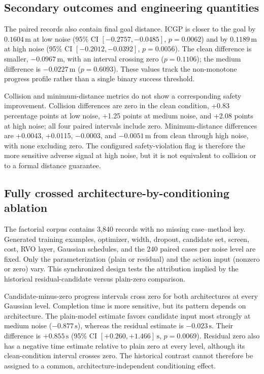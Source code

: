 \documentclass[pdflatex,sn-mathphys-num]{sn-jnl}
\begin{document}
\subsection{Secondary outcomes and engineering quantities}

The paired records also contain final goal distance. ICGP is closer to the goal by $0.1604\,\mathrm{m}$ at low noise (95\% CI $[-0.2757,-0.0485]$, $p=0.0062$) and by $0.1189\,\mathrm{m}$ at high noise (95\% CI $[-0.2012,-0.0392]$, $p=0.0056$). The clean difference is smaller, $-0.0967\,\mathrm{m}$, with an interval crossing zero ($p=0.1106$); the medium difference is $-0.0227\,\mathrm{m}$ ($p=0.6093$). These values track the non-monotone progress profile rather than a single binary success threshold.

Collision and minimum-distance metrics do not show a corresponding safety improvement. Collision differences are zero in the clean condition, +0.83 percentage points at low noise, +1.25 points at medium noise, and +2.08 points at high noise; all four paired intervals include zero. Minimum-distance differences are +0.0043, +0.0115, $-0.0003$, and $-0.0051\,\mathrm{m}$ from clean through high noise, with none excluding zero. The configured safety-violation flag is therefore the more sensitive adverse signal at high noise, but it is not equivalent to collision or to a formal distance guarantee.

\subsection{Fully crossed architecture-by-conditioning ablation}
\label{sec:factorial-ablation}

The factorial corpus contains 3,840 records with no missing case--method key. Generated training examples, optimizer, width, dropout, candidate set, screen, cost, RVO layer, Gaussian schedules, and the 240 paired cases per noise level are fixed. Only the parameterization (plain or residual) and the action input (nonzero or zero) vary. This synchronized design tests the attribution implied by the historical residual-candidate versus plain-zero comparison.

Candidate-minus-zero progress intervals cross zero for both architectures at every Gaussian level. Completion time is more sensitive, but its pattern depends on architecture. The plain-model estimate favors candidate input most strongly at medium noise ($-0.877\,\mathrm{s}$), whereas the residual estimate is $-0.023\,\mathrm{s}$. Their difference is $+0.855\,\mathrm{s}$ (95\% CI $[+0.260,+1.466]\,\mathrm{s}$, $p=0.0069$). Residual zero also has a negative time estimate relative to plain zero at every level, although its clean-condition interval crosses zero. The historical contrast cannot therefore be assigned to a common, architecture-independent conditioning effect.
\end{document}
